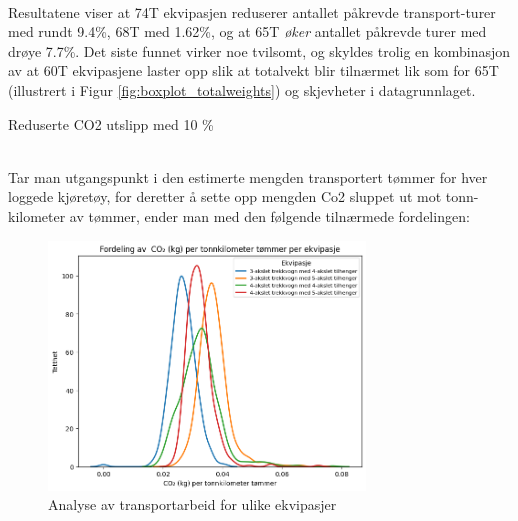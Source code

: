 \begin{table}[H]
    \caption{Prosentvise reduksjoner i antallet transport-turer sammenliknet med referanseekvipasjen på 60 tonn}
    \label{tab:transportanalyse}
\end{table}

\phantom{}\\
Resultatene viser at 74T ekvipasjen reduserer antallet påkrevde transport-turer med rundt 9.4\%, 68T med 1.62\%, og at 65T \textit{øker} antallet påkrevde turer med drøye 7.7\%.
Det siste funnet virker noe tvilsomt, og skyldes trolig en kombinasjon av at 60T ekvipasjene laster opp slik at totalvekt blir tilnærmet lik som for 65T (illustrert i Figur \ref{fig:boxplot_totalweights})
og skjevheter i datagrunnlaget.

\begin{formal}
Reduserte CO2 utslipp med 10 \%
\end{formal}

\phantom{}\\
Tar man utgangspunkt i den estimerte mengden transportert tømmer for hver loggede kjøretøy, for deretter å sette opp
mengden Co2 sluppet ut mot tonn-kilometer av tømmer, ender man med den følgende tilnærmede fordelingen:

\begin{figure}[H]
    \centering
    \includegraphics[width=0.75\textwidth]{images/co2_per_tonnagedistance.png}
    \caption{Analyse av transportarbeid for ulike ekvipasjer}
    \label{fig:co2_per_tonnagedistance}
\end{figure}

